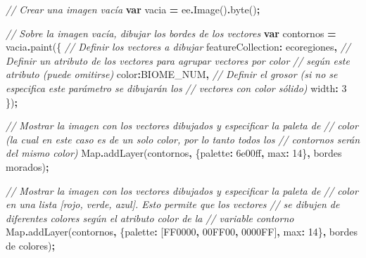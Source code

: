 \documentclass[
  12pt,
  letterpaper,
  twoside]{book}
\newenvironment{Shaded}{\begin{snugshade}}{\end{snugshade}}
\newcommand{\BuiltInTok}[1]{#1}
\newcommand{\CommentTok}[1]{\textcolor[rgb]{0.56,0.35,0.01}{\textit{#1}}}
\newcommand{\DataTypeTok}[1]{\textcolor[rgb]{0.13,0.29,0.53}{#1}}
\newcommand{\DecValTok}[1]{\textcolor[rgb]{0.00,0.00,0.81}{#1}}
\newcommand{\FunctionTok}[1]{\textcolor[rgb]{0.00,0.00,0.00}{#1}}
\newcommand{\KeywordTok}[1]{\textcolor[rgb]{0.13,0.29,0.53}{\textbf{#1}}}
\newcommand{\NormalTok}[1]{#1}
\newcommand{\OperatorTok}[1]{\textcolor[rgb]{0.81,0.36,0.00}{\textbf{#1}}}
\newcommand{\StringTok}[1]{\textcolor[rgb]{0.31,0.60,0.02}{#1}}
\begin{document}
\begin{Shaded}
\begin{Highlighting}[]
\CommentTok{// Crear una imagen vacía}
\KeywordTok{var}\NormalTok{ vacia }\OperatorTok{=}\NormalTok{ ee}\OperatorTok{.}\FunctionTok{Image}\NormalTok{()}\OperatorTok{.}\FunctionTok{byte}\NormalTok{()}\OperatorTok{;}

\CommentTok{// Sobre la imagen vacía, dibujar los bordes de los vectores}
\KeywordTok{var}\NormalTok{ contornos }\OperatorTok{=}\NormalTok{ vacia}\OperatorTok{.}\FunctionTok{paint}\NormalTok{(\{}
  \CommentTok{// Definir los vectores a dibujar}
  \DataTypeTok{featureCollection}\OperatorTok{:}\NormalTok{ ecoregiones}\OperatorTok{,}  
  \CommentTok{// Definir un atributo de los vectores para agrupar vectores por color }
  \CommentTok{// según este atributo (puede omitirse)}
  \DataTypeTok{color}\OperatorTok{:}\StringTok{\textquotesingle{}BIOME\_NUM\textquotesingle{}}\OperatorTok{,}  
  \CommentTok{// Definir el grosor (si no se especifica este parámetro se dibujarán los   }
  \CommentTok{// vectores con color sólido)       }
  \DataTypeTok{width}\OperatorTok{:} \DecValTok{3}                          
\NormalTok{\})}\OperatorTok{;}

\CommentTok{// Mostrar la imagen con los vectores dibujados y especificar la paleta de}
\CommentTok{// color (la cual en este caso es de un solo color, por lo tanto todos los}
\CommentTok{// contornos serán del mismo color)}
\BuiltInTok{Map}\OperatorTok{.}\FunctionTok{addLayer}\NormalTok{(contornos}\OperatorTok{,}\NormalTok{ \{}\DataTypeTok{palette}\OperatorTok{:} \StringTok{\textquotesingle{}6e00ff\textquotesingle{}}\OperatorTok{,} \DataTypeTok{max}\OperatorTok{:} \DecValTok{14}\NormalTok{\}}\OperatorTok{,} 
  \StringTok{\textquotesingle{}bordes morados\textquotesingle{}}\NormalTok{)}\OperatorTok{;} 

\CommentTok{// Mostrar la imagen con los vectores dibujados y especificar la paleta de}
\CommentTok{// color en una lista [rojo, verde, azul]. Esto permite que los vectores }
\CommentTok{// se dibujen de diferentes colores según el atributo \textquotesingle{}color\textquotesingle{} de la }
\CommentTok{// variable \textquotesingle{}contorno\textquotesingle{}}
\BuiltInTok{Map}\OperatorTok{.}\FunctionTok{addLayer}\NormalTok{(contornos}\OperatorTok{,}\NormalTok{ \{}\DataTypeTok{palette}\OperatorTok{:}\NormalTok{ [}\StringTok{\textquotesingle{}FF0000\textquotesingle{}}\OperatorTok{,} \StringTok{\textquotesingle{}00FF00\textquotesingle{}}\OperatorTok{,} \StringTok{\textquotesingle{}0000FF\textquotesingle{}}\NormalTok{]}\OperatorTok{,} 
  \DataTypeTok{max}\OperatorTok{:} \DecValTok{14}\NormalTok{\}}\OperatorTok{,} \StringTok{\textquotesingle{}bordes de colores\textquotesingle{}}\NormalTok{)}\OperatorTok{;} 
\end{Highlighting}
\end{Shaded}
\end{document}
